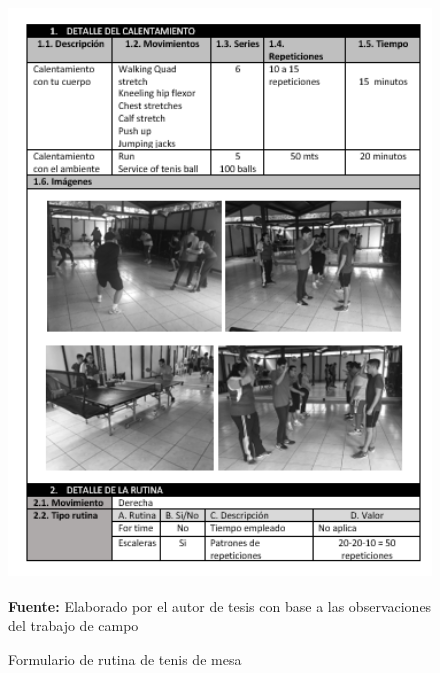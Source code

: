 \begin{figure}[H]
	\caption{Formulario de rutina de tenis de mesa}
	\label{fig:frmRoutTen}
	\centering	\includegraphics[width=445px,height=600px]{graphics/resultados/rutina-tennis.PNG} \\
	\textbf{Fuente:} Elaborado por el autor de tesis con base a las observaciones del trabajo de campo
\end{figure}
